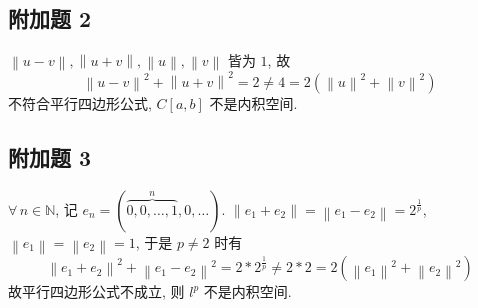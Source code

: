 \documentclass[\ROOT/main.tex]{subfiles}
\begin{document}
\subsection{附加题 2}
$\left\| u - v \right\|, \left\| u + v \right\|, \left\| u \right\|, \left\| v \right\|$ 皆为 $1$, 故
\[
    \left\| u - v \right\|^2 + \left\| u + v \right\|^2
    = 2
    \neq 4
    = 2 \left( \left\| u \right\|^2 + \left\| v \right\|^2 \right)
\]
不符合平行四边形公式, $C \left[ a, b \right]$ 不是内积空间.

\subsection{附加题 3}
$\forall \, n \in \mathbb{N}$, 记 $e_n = ( \overbrace{0, 0, \dots , 1}^n , 0, \dots)$.
$\left\| e_1 + e_2 \right\| = \left\| e_1 - e_2 \right\| = 2^{\frac{1}{p}}$, $\left\| e_1 \right\| = \left\| e_2 \right\| = 1$,
于是 $p \neq 2$ 时有
\[
    \left\| e_1 + e_2 \right\|^2 + \left\| e_1 - e_2 \right\|^2
    = 2 * 2^{\frac{1}{p}}
    \neq 2 * 2
    = 2 \left( \left\| e_1 \right\|^2 + \left\| e_2 \right\|^2 \right)
\]
故平行四边形公式不成立, 则 $l^p$ 不是内积空间.
\end{document}
